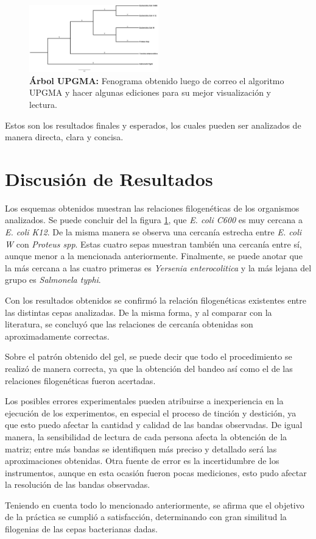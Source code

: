 \documentclass[%
 reprint,
 amsmath,amssymb,
 aps,
showkeys,
letter,
12pts
]{revtex4-1}
\begin{document}
		\begin{figure}[h!]
		\includegraphics[width=0.5\textwidth]{arbolUPGMA.jpg}
		\caption{\textbf{Árbol UPGMA:} Fenograma obtenido luego de correo el algoritmo UPGMA y hacer algunas ediciones para su mejor visualización y lectura.}
		\label{Grafica:UPGMA}
		\end{figure}	
		
		Estos son los resultados finales y esperados, los cuales pueden ser analizados de manera directa, clara y concisa.

\section{\label{sec:Dis}Discusión de Resultados}
	Los esquemas obtenidos muestran las relaciones filogenéticas de los organismos analizados. Se puede concluir del la figura \ref{Grafica:UPGMA}, que \textit{E. coli C600} es muy cercana a \textit{E. coli K12}. De la misma manera se observa una cercanía estrecha entre \textit{E. coli W} con \textit{Proteus spp}. Estas cuatro sepas muestran también una cercanía entre sí, aunque menor a la mencionada anteriormente. Finalmente, se puede anotar que la más cercana a las cuatro primeras es \textit{Yersenia enterocolitica} y la más lejana del grupo es \textit{Salmonela typhi}.
	
	Con los resultados obtenidos se confirmó la relación filogenéticas existentes entre las distintas cepas analizadas. De la misma forma, y al comparar con la literatura, se concluyó que las relaciones de cercanía obtenidas son aproximadamente correctas.
	
	Sobre el patrón obtenido del gel, se puede decir que todo el procedimiento se realizó de manera correcta, ya que la obtención del bandeo así como el de las relaciones filogenéticas fueron acertadas.
	
	Los posibles errores experimentales pueden atribuirse a inexperiencia en la ejecución de los experimentos, en especial el proceso de tinción y destición, ya que esto puedo afectar la cantidad y calidad de las bandas observadas. De igual manera, la sensibilidad de lectura de cada persona afecta la obtención de la matriz; entre más bandas se identifiquen más preciso y detallado será las aproximaciones obtenidas. Otra fuente de error es la incertidumbre de los instrumentos, aunque en esta ocasión fueron pocas mediciones, esto pudo afectar la resolución de las bandas observadas.
	
	Teniendo en cuenta todo lo mencionado anteriormente, se afirma que el objetivo de la práctica se cumplió a satisfacción, determinando con gran similitud la filogenias de las cepas bacterianas dadas.	
	
	
	



\end{document}
